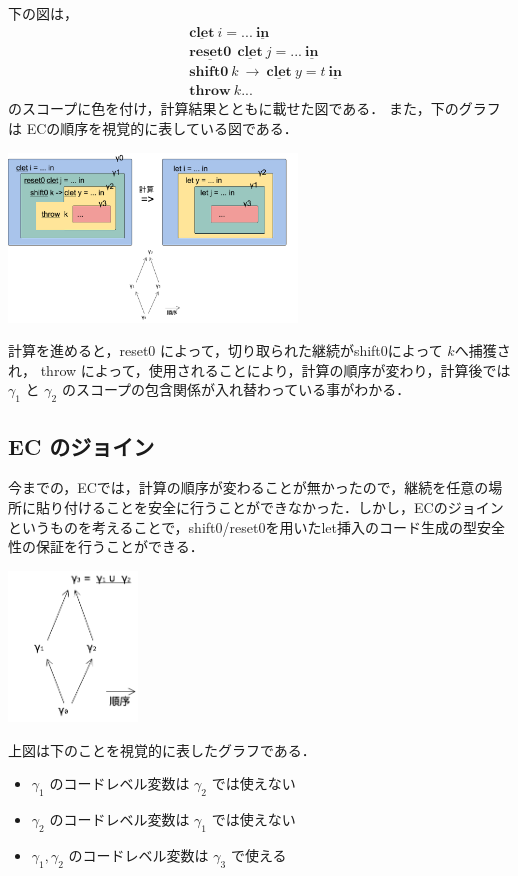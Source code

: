 \documentclass[10pt,a4j,twocolumn]{jarticle}
\newcommand\Shiftz{\textbf{shift0}}
\newcommand\Throw{\textbf{throw}}
\newcommand\cResetz{\underline{\textbf{reset0}}}
\newcommand\cLet{\underline{\textbf{clet}}}
\newcommand\cIn{\underline{\textbf{in}}}
\theoremstyle{definition}
\begin{document}
下の図は，
\begin{align*}
  & \cLet~ i = ...~\cIn \\
  & \cResetz ~~\cLet~ j = ...~\cIn \\
  & \Shiftz~ k~ \to~ \cLet~y=t~\cIn \\
  & \Throw~ k ...
\end{align*}
のスコープに色を付け，計算結果とともに載せた図である．
また，下のグラフは ECの順序を視覚的に表している図である．

\begin{center}
  \includegraphics[clip,height=4.5cm]{./img/resume_ecex.png}
\end{center}
計算を進めると，reset0 によって，切り取られた継続がshift0によって $k$へ捕獲され， throw によって，使用されることにより，計算の順序が変わり，計算後では$\gamma_1$ と $\gamma_2$ のスコープの包含関係が入れ替わっている事がわかる．

\subsection{EC のジョイン}
今までの，ECでは，計算の順序が変わることが無かったので，継続を任意の場所に貼り付けることを安全に行うことができなかった．しかし，ECのジョインというものを考えることで，shift0/reset0を用いたlet挿入のコード生成の型安全性の保証を行うことができる．

\begin{center}
  \includegraphics[clip,height=4cm]{./img/ecgraph.png}
\end{center}

上図は下のことを視覚的に表したグラフである．
\begin{itemize}
\item $\gamma_1$ のコードレベル変数は $\gamma_2$ では使えない
\item $\gamma_2$ のコードレベル変数は $\gamma_1$ では使えない
\item $\gamma_1, \gamma_2$ のコードレベル変数は $\gamma_3$ で使える
\end{itemize}
\end{document}
